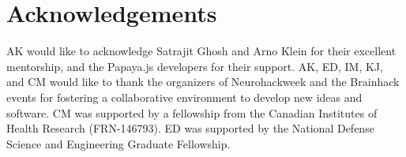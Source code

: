 \section{Acknowledgements}
AK would like to acknowledge Satrajit Ghosh and Arno Klein for their excellent mentorship, and the Papaya.js developers for their support. AK, ED, IM, KJ, and CM would like to thank the organizers of Neurohackweek and the Brainhack events for fostering a collaborative environment to develop new ideas and software. CM was supported by a fellowship from the Canadian Institutes of Health Research (FRN-146793).  ED was supported by the National Defense Science and Engineering Graduate Fellowship. 

